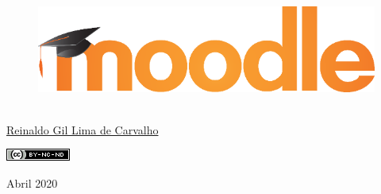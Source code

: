\thispagestyle{empty}

\begin{center}
  \begin{figure}[H]
    \begin{center}
      \hspace{-1cm}
      \includegraphics[width=0.55\columnwidth]{titlepage}
  ~\cite{FrontPageIMG}
    \end{center}      
  \end{figure}

  \vskip 2cm

  \hspace{-1cm}
  \begin{minipage}[c]{17cm}
    \begin{center}

{\huge {}\vskip 0.15cm %

{\large \href{http://reinaldoc.wordpress.com}{Reinaldo Gil Lima de Carvalho}} %

{\includegraphics[width=0.1\columnwidth]{imgs/license-CC-BY-NC-ND_header.png}}

}
    \end{center}
  \end{minipage}

  \vskip 14cm

  {\huge Abril 2020} %
\end{center}
